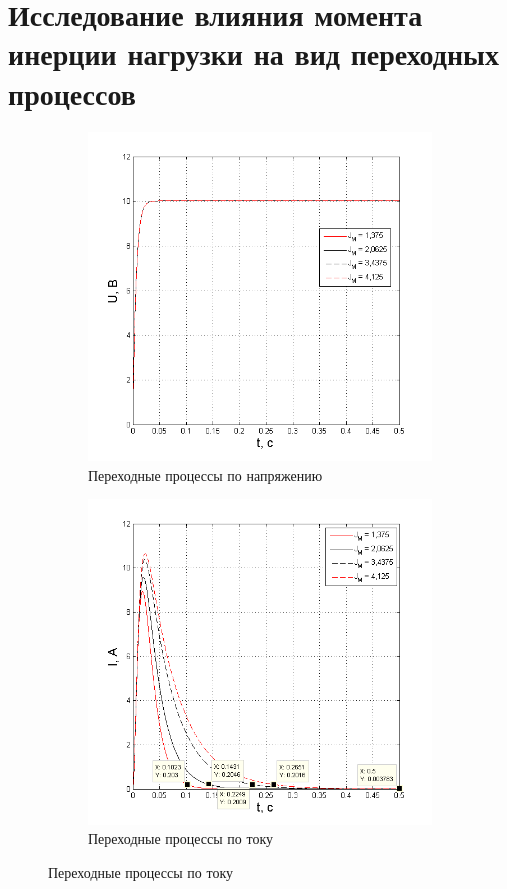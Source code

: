 \documentclass[fleqn, a4paper, 11pt, russian]{article}
\begin{document}
	\section{Исследование влияния момента инерции нагрузки на вид переходных процессов}
	\begin{figure}[ht!]
		\centering
		\begin{subfigure}[b]{0.48\textwidth}
			\includegraphics[width = \textwidth]{JvarU}
			\caption{Переходные процессы по напряжению}
		\end{subfigure}
		\hfill
		\begin{subfigure}[b]{0.48\textwidth}
			\includegraphics[width = \textwidth]{JvarI}
			\caption{Переходные процессы по току}
		\end{subfigure}
	\end{figure}
	
\end{document}
